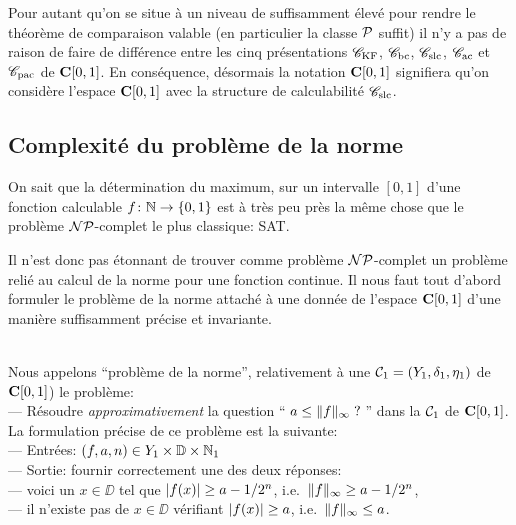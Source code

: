 \begin{fnotation} \label{f4212}
Pour autant qu'on se situe à un niveau de \com suffisamment élevé pour 
rendre le théorème de comparaison valable (en particulier la classe  ${\cal P}$  
suffit)  il n'y a pas de raison de faire de différence entre les cinq 
présentations  ${{{\mathscr C}}_{\rm KF}}$,  ${{{\mathscr C}}_{\rm bc}}$,  ${{{\mathscr C}}_{\rm slc}}$,  ${{{\mathscr C}}_{\rm ac}}$   et   ${{{\mathscr C}}_{\rm pac}}$  de  ${{\bf C}[0,1]}$. 
En conséquence, désormais la notation  ${{\bf C}[0,1]}$  signifiera qu'on considère 
l'espace  ${{\bf C}[0,1]}$  avec la structure de calculabilité  ${{{\mathscr C}}_{\rm slc}}$.
\end{fnotation}

\subsection{Complexité du problème de la norme}\label{fsubsec43}
On sait que la détermination du maximum,  sur un intervalle  $[0,1]$   d'une 
fonction calculable \etpo  $f \colon  \mathbb {N} \rightarrow \{ 0,1 \}$ 
 est à très peu près la même chose que le problème ${\cal NP}$-complet le 
plus classique:  SAT. 
 
Il n'est donc pas étonnant de trouver comme problème  
${\cal NP}$-complet un problème relié au calcul de la norme pour une fonction 
continue. Il nous faut tout d'abord formuler le problème de la norme attaché 
à une \rp  donnée de l'espace  ${{\bf C}[0,1]}$  d'une manière suffisamment 
précise et invariante. 
   
\begin{fdefinition}\label{f431}~\\
Nous appelons ``problème de la norme'', relativement à une \pres ${{\cal C}}_1 = 
(Y_1, \delta_1, \eta_1)$ de  ${{\bf C}[0,1]}$)  le problème:\\
--- Résoudre {\em approximativement}  la question  
``$\; a \leq \lVert  f  \rVert_{\infty}\;?\;$''  dans la \pres  ${{\cal C}}_1$  de ${{\bf C}[0,1]}$.\\
La formulation précise de ce problème est la suivante:\\
--- Entrées:  $(f,a,n) \in Y_1 \times \mathbb {D} \times \mathbb {N}_1$ \\
--- Sortie:    fournir correctement une des deux réponses:\\
\hspace*{1cm}--- voici un $x \in \DD$  tel que 
$\left|{f(x)}\right|  \geq a - 1/2^n$, i.e.\  $\lVert f \rVert_{\infty}\geq a - 1/2^n$, \\
\hspace*{1cm}--- il n'existe pas de  $x \in \DD$  vérifiant  
$\left|{f(x)}\right|  \geq a$,  i.e.\  $\lVert f \rVert_{\infty}\leq a$.       
\end{fdefinition}

